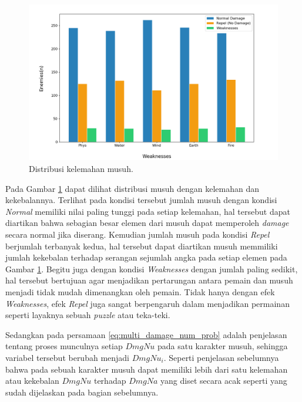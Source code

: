 \begin{figure} [!h] \centering
	\includegraphics[scale=0.50]{img/EnemyWeakDistrib.png}
	\caption{Distribusi kelemahan musuh.}
	\label{fig:enemy_weak_distrib}
\end{figure}

Pada Gambar \ref{fig:enemy_weak_distrib} dapat dilihat distribusi musuh dengan kelemahan dan kekebalannya. Terlihat pada kondisi tersebut jumlah musuh dengan kondisi \textit{Normal} memiliki nilai paling tunggi pada setiap kelemahan, hal tersebut dapat diartikan bahwa sebagian besar elemen dari musuh dapat memperoleh \textit{damage} secara normal jika diserang. Kemudian jumlah musuh pada kondisi \textit{Repel} berjumlah terbanyak kedua, hal tersebut dapat diartikan musuh memmiliki jumlah kekebalan terhadap serangan sejumlah angka pada setiap elemen pada Gambar \ref{fig:enemy_weak_distrib}. Begitu juga dengan kondisi \textit{Weaknesses} dengan jumlah paling sedikit, hal tersebut bertujuan agar menjadikan pertarungan antara pemain dan musuh menjadi tidak mudah dimenangkan oleh pemain. Tidak hanya dengan efek \textit{Weaknesses}, efek \textit{Repel} juga sangat berpengaruh dalam menjadikan permainan seperti layaknya sebuah \textit{puzzle} atau teka-teki.
\vspace{1ex}

Sedangkan pada persamaan \ref{eq:multi_damage_num_prob} adalah penjelasan tentang proses munculnya setiap $DmgNu$ pada satu karakter musuh, sehingga variabel tersebut berubah menjadi $DmgNu_{i}$. Seperti penjelasan sebelumnya bahwa pada sebuah karakter musuh dapat memiliki lebih dari satu kelemahan atau kekebalan $DmgNu$ terhadap $DmgNa$ yang diset secara acak seperti yang sudah dijelaskan pada bagian sebelumnya. 
\vspace{1ex}


